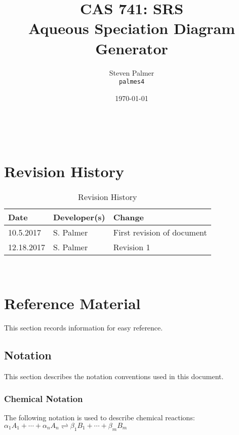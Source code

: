 \documentclass[12pt]{article}
\begin{document}

\title{CAS 741: SRS\\[10pt]\Large Aqueous Speciation Diagram Generator}
\author{Steven Palmer\\\texttt{palmes4}}
\date{\today}
	
\maketitle

~\newpage


\setcounter{secnumdepth}{0}

\section{Revision History}

\begin{table}[hp]
\caption{Revision History} \label{TblRevisionHistory}
\begin{tabularx}{\textwidth}{llX}
\toprule
\textbf{Date} & \textbf{Developer(s)} & \textbf{Change}\\
\midrule
10.5.2017 & S. Palmer & First revision of document\\
12.18.2017 & S. Palmer & Revision 1\\
\bottomrule
\end{tabularx}
\end{table}

~\newpage

\section{Reference Material}

This section records information for easy reference.

\subsection{Notation}
This section describes the notation conventions used in this document. 

\subsubsection{Chemical Notation}
The following notation is used to describe chemical reactions:\\

${\alpha}_1 {A}_{1} + \cdots + {\alpha}_n {A}_{n} 
    \rightleftharpoons {\beta}_1 {B}_{1} + \cdots + {\beta}_m {B}_{m}$\\
\end{document}
